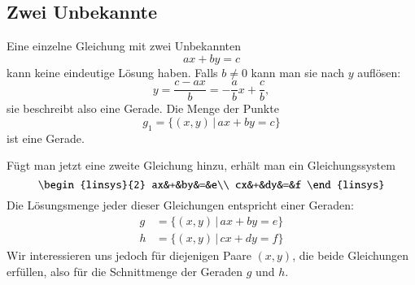 \subsection{Zwei Unbekannte}
Eine einzelne Gleichung mit zwei Unbekannten 
\[
ax+by=c
\]
kann keine eindeutige Lösung haben.
Falls $b\ne 0$ kann man
sie nach $y$ auflösen:
\[
y=\frac{c-ax}b=-\frac{a}{b}x+\frac{c}b,
\]
sie beschreibt also eine Gerade.
Die Menge der Punkte 
\[
g_1=\{(x,y)\,|\,ax+by=c\}
\]
ist eine Gerade.

Fügt man jetzt eine zweite Gleichung hinzu, erhält man
ein Gleichungssystem
\[
\begin{linsys}{2}
ax&+&by&=&e\\
cx&+&dy&=&f
\end{linsys}
\]
Die Lösungsmenge jeder dieser Gleichungen entspricht einer
Geraden:
\begin{align*}
g&=\{(x,y)\,|\,ax+by=e\}\\
h&=\{(x,y)\,|\,cx+dy=f\}
\end{align*}
Wir interessieren uns jedoch für diejenigen Paare $(x,y)$,
die beide Gleichungen erfüllen, also für die Schnittmenge
der Geraden $g$ und $h$.

